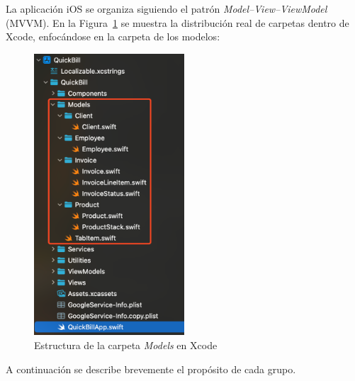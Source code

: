 \begin{large}

La aplicación iOS se organiza siguiendo el patrón \textit{Model–View–ViewModel} (MVVM). En la Figura~\ref{fig:models_folder} se muestra la distribución real de carpetas dentro de Xcode, enfocándose en la carpeta de los modelos:

\begin{figure}[H]
\centering
\includegraphics[width=0.5\textwidth]{Ilustraciones/ios_models_folder.png}
\caption{Estructura de la carpeta \textit{Models} en Xcode}
\label{fig:models_folder}
\end{figure}

A continuación se describe brevemente el propósito de cada grupo.


\end{large}
